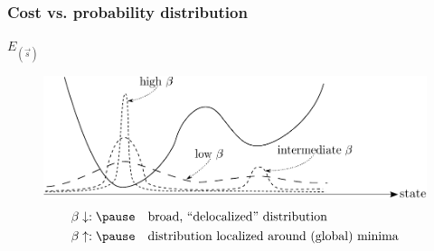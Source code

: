 \begin{frame}\frametitle{Cost vs. probability distribution}

$E_{(\vec{s})}$
\vspace{-0.2cm}
\begin{figure}[h]
  \centering
\includegraphics[width=12cm]{img/section3_fig7}  
\[ \begin{array}{ll}
	\beta \downarrow:\pause
	& \text{broad, ``delocalized'' distribution} \\\vspace{-0.3cm}\\
	\beta \uparrow:\pause
	& \text{distribution localized around (global) minima}
\end{array} \]
\end{figure}


\end{frame}



